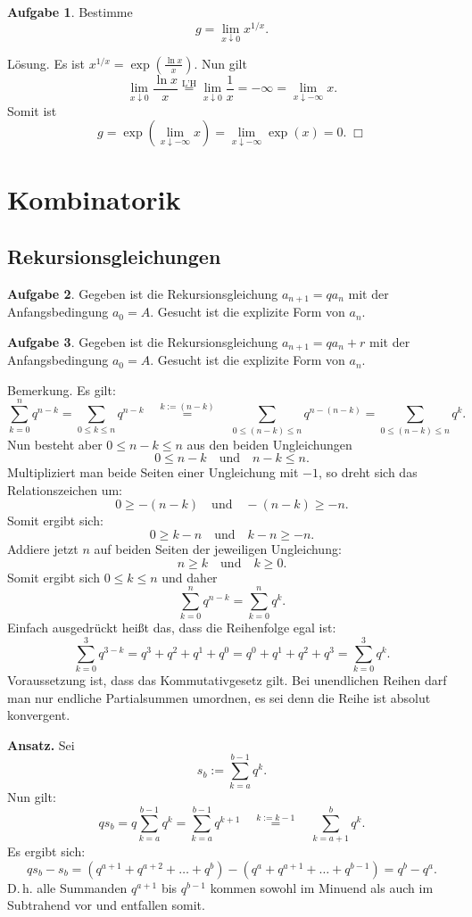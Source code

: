 \documentclass[a4paper,12pt,fleqn,twoside]{article}
\numberwithin{equation}{section}
\newcommand{\strong}[1]{{\sf\bfseries #1}}
\theoremstyle{definition}
\newtheorem{Aufgabe}{\sffamily Aufgabe}[section]
\begin{document}
\begin{Aufgabe}
Bestimme
\[g=\lim_{x\downarrow 0} x^{1/x}.\]
\end{Aufgabe}
\noindent
Lösung. Es ist $x^{1/x}=\exp(\frac{\ln x}{x})$.
Nun gilt
\[\lim_{x\downarrow 0}\frac{\ln x}{x}
\stackrel{\text{L'H}}= \lim_{x\downarrow 0}\frac{1}{x}
= -\infty = \lim_{x\downarrow -\infty} x.\]
Somit ist
\[g = \exp(\lim_{x\downarrow -\infty} x)
= \lim_{x\downarrow -\infty} \exp(x) = 0.\;\Box\]

\section{Kombinatorik}
\subsection{Rekursionsgleichungen}

\begin{Aufgabe}\label{qPotenzen}
Gegeben ist die Rekursionsgleichung $a_{n+1} = qa_n$
mit der Anfangsbedingung $a_0=A.$
Gesucht ist die explizite Form von $a_n$.
\end{Aufgabe}

\begin{Aufgabe}
Gegeben ist die Rekursionsgleichung
$a_{n+1} = qa_n+r$
mit der Anfangsbedingung
$a_0=A.$
Gesucht ist die explizite Form von $a_n$.
\end{Aufgabe}

\noindent
Bemerkung. Es gilt:
\[\sum_{k=0}^n q^{n-k} = \sum_{0\le k\le n} q^{n-k}
\quad\stackrel{k:=(n-k)}=\quad\sum_{0\le (n-k)\le n} q^{n-(n-k)}
= \sum_{0\le (n-k)\le n} q^k.
\]
Nun besteht aber $0\le n-k\le n$ aus den beiden Ungleichungen
\[0\le n-k\quad\text{und}\quad n-k\le n.\]
Multipliziert man beide Seiten einer Ungleichung mit $-1$, so dreht
sich das Relationszeichen um:
\[0\ge -(n-k)\quad\text{und}\quad -(n-k)\ge -n.\]
Somit ergibt sich:
\[0\ge k-n\quad\text{und}\quad k-n\ge -n.\]
Addiere jetzt $n$ auf beiden Seiten der jeweiligen Ungleichung:
\[n\ge k\quad\text{und}\quad k\ge 0.\]
Somit ergibt sich $0\le k\le n$ und daher
\[\sum_{k=0}^n q^{n-k} = \sum_{k=0}^n q^k.\]
Einfach ausgedrückt heißt das, dass die Reihenfolge egal ist:
\[\sum_{k=0}^3 q^{3-k} = q^3+q^2+q^1+q^0 = q^0+q^1+q^2+q^3 = \sum_{k=0}^3 q^k.\]
Voraussetzung ist, dass das Kommutativgesetz gilt. Bei unendlichen
Reihen darf man nur endliche Partialsummen umordnen, es sei denn
die Reihe ist absolut konvergent.

\strong{Ansatz.} Sei
\[s_b := \sum_{k=a}^{b-1} q^k.\]
Nun gilt:
\[qs_b = q\sum_{k=a}^{b-1} q^k = \sum_{k=a}^{b-1} q^{k+1}
\quad\stackrel{k:=k-1}=\quad\sum_{k=a+1}^b q^k.\]
Es ergibt sich:
\[qs_b-s_b = (q^{a+1}+q^{a+2}+\ldots+q^{b})-(q^a+q^{a+1}+\ldots+q^{b-1}) = q^b-q^a.\]
D.\,h. alle Summanden $q^{a+1}$ bis $q^{b-1}$ kommen sowohl im Minuend als auch im Subtrahend vor und
entfallen somit.
\end{document}
